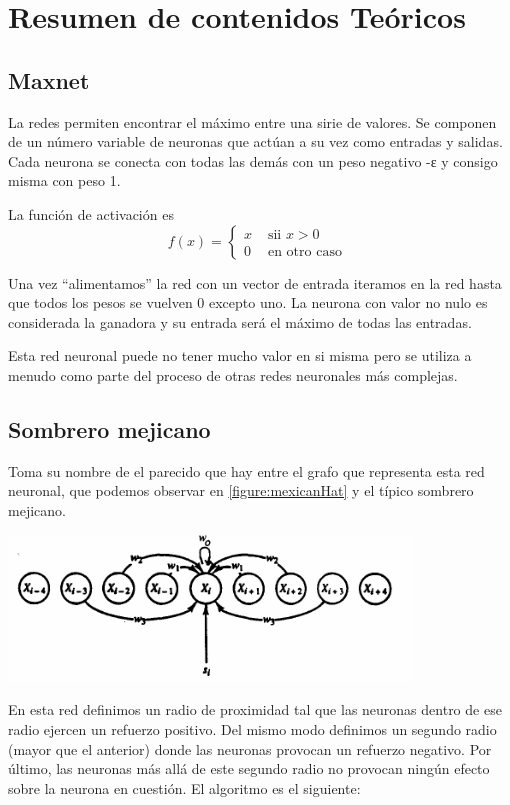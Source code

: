 \section{Resumen de contenidos Teóricos}
\subsection{Maxnet}
La redes  permiten encontrar el máximo entre una sirie de valores. Se componen de un número variable de neuronas que actúan a su vez como entradas y salidas. Cada neurona se conecta con todas las demás con un peso negativo -ε y consigo misma con peso 1.

La función de activación es
\[f(x) = \left\{\begin{array}{ll} x & \text{ sii } x > 0 \\ 0 & \text{ en otro caso } \end{array} \right.\]

Una vez ``alimentamos'' la red con un vector de entrada iteramos en la red hasta que todos los pesos se vuelven 0 excepto uno. La neurona con valor no nulo es considerada la ganadora y su entrada será el máximo de todas las entradas.

\obs Esta red neuronal puede no tener mucho valor en si misma pero se utiliza a menudo como parte del proceso de otras redes neuronales más complejas.

\subsection{Sombrero mejicano}
Toma su nombre de el parecido que hay entre el grafo que representa esta red neuronal, que podemos observar en \ref{figure:mexicanHat} y el típico sombrero mejicano.

\begin{center}
\includegraphics[width=0.8\textwidth]{img/mexicanHat.png}
\label{figure:mexicanHat}
\end{center}

En esta red definimos un radio de proximidad tal que las neuronas dentro de ese radio ejercen un refuerzo positivo. Del mismo modo definimos un segundo radio (mayor que el anterior) donde las neuronas provocan un refuerzo negativo. Por último, las neuronas más allá de este segundo radio no provocan ningún efecto sobre la neurona en cuestión. El algoritmo es el siguiente:


